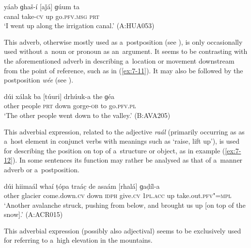 \begin{exe}
\ex
\label{ex:7-10}
\gll yáab ɡhaš-í [aǰá] ɡúum ta  \\
canal take-\textsc{cv} up go.\textsc{pfv.msg} \textsc{prt} \\
\glt `I went up along the irrigation canal.' (A:HUA053)
\end{exe}

 This adverb, otherwise mostly used as a~postposition (see ), is only occasionally used without a~noun or pronoun as an~argument. It seems to be contrasting with the aforementioned adverb in describing a~location or movement downstream from the point of reference, such as in (\ref{ex:7-11}). It may also be followed by the postposition \textit{wée} (see ). 

\begin{exe}
\ex
\label{ex:7-11}
\gll dúi xálak ba [túuri] drhúuk-a the ɡéa  \\
other people \textsc{prt} down gorge-\textsc{ob}  to go.\textsc{pfv.pl} \\
\glt `The other people went down to the valley.' (B:AVA205)
\end{exe}

 This adverbial expression, related to the adjective \textit{raál} (primarily occurring as as a~host element in conjunct verbs with meanings such as `raise, lift up'), is used for describing the position on top of a~structure or object, as in example (\ref{ex:7-12}). In some sentences its function may rather be analysed as that of a~manner adverb or a~postposition.

\begin{exe}
\ex
\label{ex:7-12}
\gll dúi hiimaál whaí ṭópa traác̣ de asaám  [rhalá] ɡaḍíl-a\\
other glacier come.down.\textsc{cv} down \textsc{idph} give.\textsc{cv} \textsc{1pl.acc} up take.out.\textsc{pfv"=mpl}\\
\glt `Another avalanche struck, pushing from below, and brought us up [on top of the snow].' (A:ACR015)
\end{exe}

 This adverbial expression (possibly also adjectival) seems to be exclusively used for referring to a~high elevation in the mountains.


